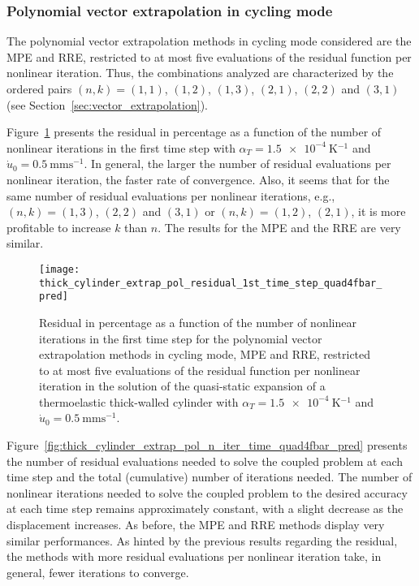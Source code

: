 \FloatBarrier

\subsubsection{Polynomial vector extrapolation in cycling mode}

The polynomial vector extrapolation methods in cycling mode considered are the MPE and RRE, restricted to at most five evaluations of the residual function per nonlinear iteration.
Thus, the combinations analyzed are characterized by the ordered pairs \((n,k)=(1,1)\), \((1,2)\), \((1,3)\), \((2,1)\), \((2,2)\) and \((3,1)\) (see Section~\ref{sec:vector_extrapolation}).

Figure~\ref{fig:thick_cylinder_extrap_pol_residual_1st_time_step_quad4fbar_pred} presents the residual in percentage as a function of the number of nonlinear iterations in the first time step with \(\alpha_T=\SI{1.5e-4}{\kelvin^{-1}}\) and \(\dot u_0 =\SI{0.5}{\milli\meter\second^{-1}}\).
In general, the larger the number of residual evaluations per nonlinear iteration, the faster rate of convergence.
Also, it seems that for the same number of residual evaluations per nonlinear iterations, e.g., \((n,k)=(1,3)\), \((2,2)\) and \((3,1)\) or \((n,k)=(1,2)\), \((2,1)\), it is more profitable to increase \(k\) than \(n\).
The results for the MPE and the RRE are very similar.

\begin{figure}[htbp]
 \centering
 \texttt{[image: thick\_cylinder\_extrap\_pol\_residual\_1st\_time\_step\_quad4fbar\_pred]}
 \caption{Residual in percentage as a function of the number of nonlinear iterations in the first time step for the polynomial vector extrapolation methods in cycling mode, MPE and RRE, restricted to at most five evaluations of the residual function per nonlinear iteration in the solution of the quasi-static expansion of a thermoelastic thick-walled cylinder with \(\alpha_T=\SI{1.5e-4}{\kelvin^{-1}}\) and \(\dot u_0 =\SI{0.5}{\milli\meter\second^{-1}}\).}
\label{fig:thick_cylinder_extrap_pol_residual_1st_time_step_quad4fbar_pred}
\end{figure}

Figure~\ref{fig:thick_cylinder_extrap_pol_n_iter_time_quad4fbar_pred} presents the number of residual evaluations needed to solve the coupled problem at each time step and the total (cumulative) number of iterations needed.
The number of nonlinear iterations needed to solve the coupled problem to the desired accuracy at each time step remains approximately constant, with a slight decrease as the displacement increases.
As before, the MPE and RRE methods display very similar performances.
As hinted by the previous results regarding the residual, the methods with more residual evaluations per nonlinear iteration take, in general, fewer iterations to converge.

